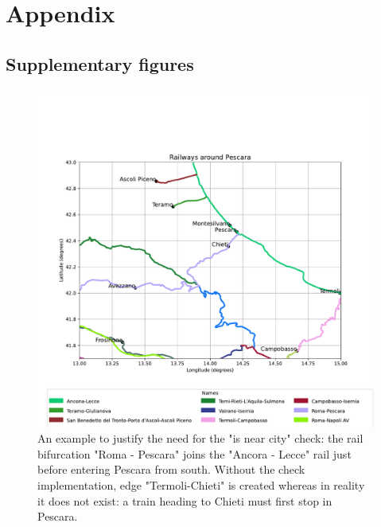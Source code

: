 \section*{Appendix}
\subsection*{Supplementary figures}
\begin{figure}[H]
    \centering
    \includegraphics[width= \textwidth]{latex_source/images/railways/pescara_area.pdf}
    \caption{An example to justify the need for the "is near city" check: the rail bifurcation "Roma - Pescara" joins the "Ancora - Lecce" rail just before entering Pescara from south. Without the check implementation, edge "Termoli-Chieti" is created whereas in reality it does not exist: a train heading to Chieti must first stop in Pescara. }
    \label{fig:pescara_area}
\end{figure}
